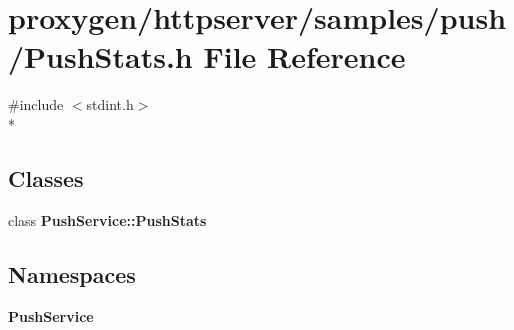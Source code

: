 \section{proxygen/httpserver/samples/push/\+Push\+Stats.h File Reference}
\label{PushStats_8h}
{\ttfamily \#include $<$stdint.\+h$>$}\\*
\subsection*{Classes}
\begin{DoxyCompactItemize}
\item 
class {\bf Push\+Service\+::\+Push\+Stats}
\end{DoxyCompactItemize}
\subsection*{Namespaces}
\begin{DoxyCompactItemize}
\item 
 {\bf Push\+Service}
\end{DoxyCompactItemize}
